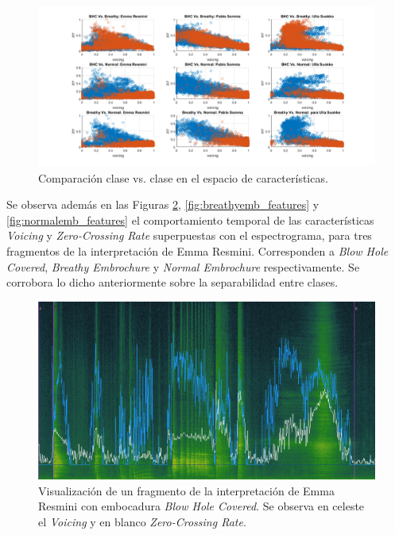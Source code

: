 \documentclass{article}
\begin{document}
\begin{figure}[H]
\begin{center}
\includegraphics[width=1\textwidth]{comparative} 
\caption{Comparación clase vs. clase en el espacio de características.}
\label{fig:comparative}
\end{center}
\end{figure}

\newpage


Se observa además en las Figuras \ref{fig:bhc_features}, \ref{fig:breathyemb_features} y \ref{fig:normalemb_features} el comportamiento temporal de las características \textit{Voicing} y \textit{Zero-Crossing Rate} superpuestas con el espectrograma, para tres fragmentos de la interpretación de Emma Resmini. Corresponden a \textit{Blow Hole Covered}, \textit{Breathy Embrochure} y \textit{Normal Embrochure} respectivamente. Se corrobora lo dicho anteriormente sobre la separabilidad entre clases.

\begin{figure}[H]
\begin{center}
\includegraphics[width=1\textwidth]{bhc_features} 
\caption{Visualización de un fragmento de la interpretación de Emma Resmini con embocadura \textit{Blow Hole Covered}. Se observa en celeste el \textit{Voicing} y en blanco \textit{Zero-Crossing Rate}.}
\label{fig:bhc_features}
\end{center}
\end{figure}
\end{document}
